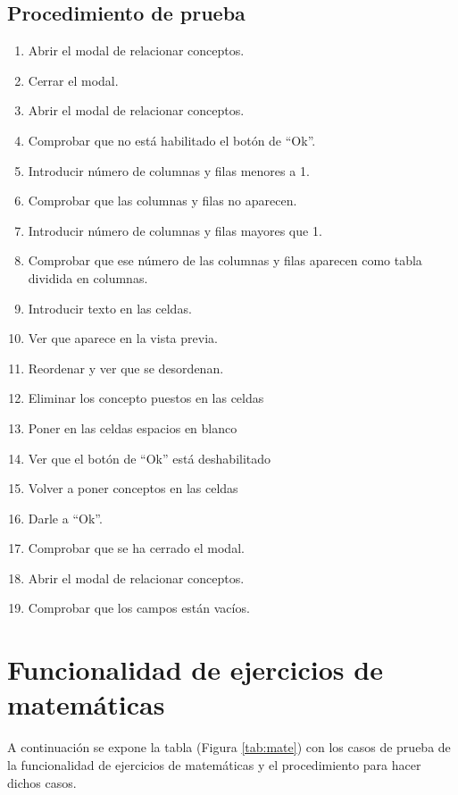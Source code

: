 \subsection{Procedimiento de prueba}
\label{procedimientoPruebas:conceptos}
\begin{enumerate}
\item Abrir el modal de relacionar conceptos.
\item Cerrar el modal.
\item Abrir el modal de relacionar conceptos.
\item Comprobar que no está habilitado el botón de ``Ok''.
\item Introducir número de columnas y filas  menores a 1.
\item Comprobar que las columnas y filas no aparecen.
\item Introducir número de columnas y filas mayores que 1.
\item Comprobar que ese número de  las columnas y filas aparecen como tabla dividida en columnas.
\item Introducir texto en las celdas. 
\item Ver que aparece en la vista previa.
\item Reordenar y ver que se desordenan.
\item Eliminar los concepto puestos en las celdas 
\item Poner en las celdas espacios en blanco
\item Ver que el botón de ``Ok'' está deshabilitado
\item Volver a poner conceptos en las celdas
\item Darle a ``Ok''.
\item Comprobar que se ha cerrado el modal.
\item Abrir el modal de relacionar conceptos.
\item Comprobar que los campos están vacíos.
    
\end{enumerate}


\section{Funcionalidad de ejercicios de matemáticas}
\label{planPruebas:mate}
A continuación se expone la tabla (Figura \ref{tab:mate}) con los casos de prueba de la funcionalidad de ejercicios de matemáticas y el procedimiento para hacer dichos casos.



